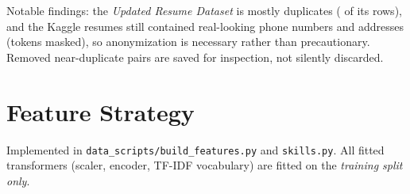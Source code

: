 \documentclass[11pt,a4paper]{article}
\newcommand{\code}[1]{\texttt{\small #1}}
\begin{document}
\noindent Notable findings: the \emph{Updated Resume Dataset} is mostly duplicates (\ResExactDupUpd
of its \ResRawUpd rows), and the Kaggle resumes still contained real-looking phone numbers and
addresses (\ResPIItokens tokens masked), so anonymization is necessary rather than precautionary.
Removed near-duplicate pairs are saved for inspection, not silently discarded.

\section{Feature Strategy}\label{sec:features}
Implemented in \code{data\_scripts/build\_features.py} and \code{skills.py}. All fitted
transformers (scaler, encoder, TF-IDF vocabulary) are fitted on the \emph{training split only}.
\end{document}

